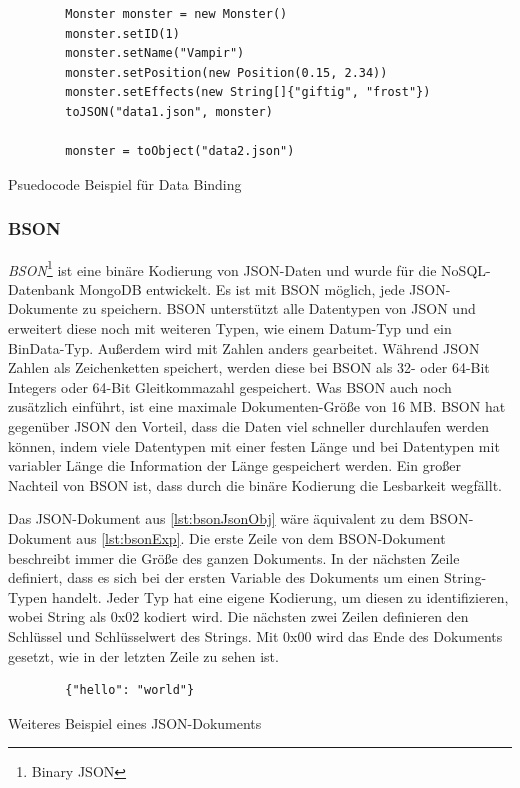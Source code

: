 \begin{listing}[htp]
    \begin{verbatim} 
        Monster monster = new Monster()
        monster.setID(1)
        monster.setName("Vampir")
        monster.setPosition(new Position(0.15, 2.34))
        monster.setEffects(new String[]{"giftig", "frost"})
        toJSON("data1.json", monster)

        monster = toObject("data2.json")
    \end{verbatim}
    \caption{Psuedocode Beispiel für Data Binding}
    \label{lst:dataBindingBsp}
\end{listing}

\subsubsection{BSON}
\textit{BSON}\footnote{Binary JSON} ist eine binäre Kodierung von JSON-Daten und wurde für die NoSQL-Datenbank MongoDB entwickelt. Es ist mit BSON möglich, jede JSON-Dokumente zu speichern. BSON unterstützt alle Datentypen von JSON und erweitert diese noch mit weiteren Typen, wie einem Datum-Typ und ein BinData-Typ. Außerdem wird mit Zahlen anders gearbeitet. Während JSON Zahlen als Zeichenketten speichert, werden diese bei BSON als 32- oder 64-Bit Integers oder 64-Bit Gleitkommazahl gespeichert. Was BSON auch noch zusätzlich einführt, ist eine maximale Dokumenten-Größe von 16 MB. BSON hat gegenüber JSON den Vorteil, dass die Daten viel schneller durchlaufen werden können, indem viele Datentypen mit einer festen Länge und bei Datentypen mit variabler Länge die Information der Länge gespeichert werden. Ein großer Nachteil von BSON ist, dass durch die binäre Kodierung die Lesbarkeit wegfällt.\cite{bsonspecBSONBinary}\cite{postgreSQLandBSON}\cite{mongodbJSONBSON}

Das JSON-Dokument aus \ref{lst:bsonJsonObj} wäre äquivalent zu dem BSON-Dokument aus \ref{lst:bsonExp}. Die erste Zeile von dem BSON-Dokument beschreibt immer die Größe des ganzen Dokuments. In der nächsten Zeile definiert, dass es sich bei der ersten Variable des Dokuments um einen String-Typen handelt. Jeder Typ hat eine eigene Kodierung, um diesen zu identifizieren, wobei String als 0x02 kodiert wird. Die nächsten zwei Zeilen definieren den Schlüssel und Schlüsselwert des Strings. Mit 0x00 wird das Ende des Dokuments gesetzt, wie in der letzten Zeile zu sehen ist.

\begin{listing}[htp]
    \begin{verbatim}
        {"hello": "world"}
    \end{verbatim}
    \caption{Weiteres Beispiel eines JSON-Dokuments \cite{mongodbJSONBSON}}
    \label{lst:bsonJsonObj}
\end{listing} 

